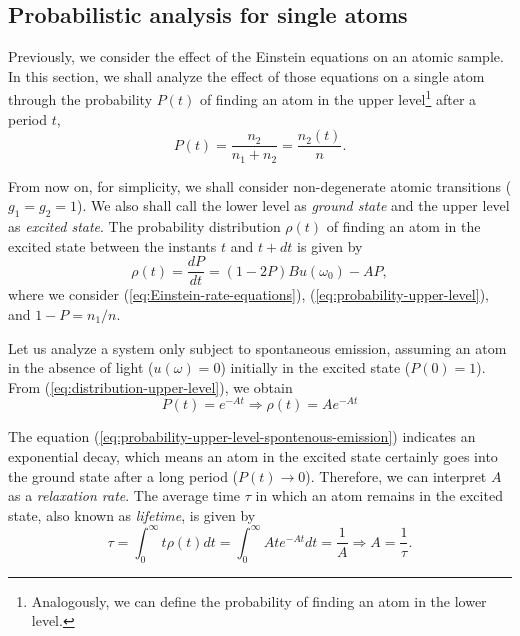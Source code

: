 %
\subsection{Probabilistic analysis for single atoms}
\label{sec:rate-equations-analysis-single-atoms}
%

Previously, we consider the effect of the Einstein equations on an atomic sample. In this section, we shall analyze the effect of those equations on a single atom through the probability $ P(t) $ of finding an atom in the upper level\footnote{Analogously, we can define the probability of finding an atom in the lower level.} after a period $t$,
\begin{equation}
	P(t) = \frac{n_2}{n_1 + n_2} = \frac{n_2(t)}{n}.
	\label{eq:probability-upper-level}
\end{equation}

From now on, for simplicity, we shall consider non-degenerate atomic transitions ($ g_1 = g_2 = 1 $). We also shall call the lower level as \textit{ground state} and the upper level as \textit{excited state}. The probability distribution $ \rho(t) $ of finding an atom in the excited state between the instants $t$ and $t + dt$ is given by
\begin{equation}
	\rho(t) = \frac{dP}{dt} = (1 - 2P) B u(\omega_0) - A P,
	\label{eq:distribution-upper-level}
\end{equation}
where we consider (\ref{eq:Einstein-rate-equations}), (\ref{eq:probability-upper-level}), and $ 1 - P = n_1 / n $.

Let us analyze a system only subject to spontaneous emission, assuming an atom in the absence of light ($ u(\omega) = 0 $) initially in the excited state ($ P(0) = 1 $). From (\ref{eq:distribution-upper-level}), we obtain
\begin{equation}
	P(t) = e^{-A t} \Rightarrow \rho(t) = A e^{-A t}
	\label{eq:probability-upper-level-spontenous-emission}
\end{equation}

The equation (\ref{eq:probability-upper-level-spontenous-emission}) indicates an exponential decay, which means an atom in the excited state certainly goes into the ground state after a long period ($ P(t) \longrightarrow 0 $). Therefore, we can interpret $ A $ as a \textit{relaxation rate}. The average time $ \tau $ in which an atom remains in the excited state, also known as \textit{lifetime}, is given by
\begin{equation}
	\tau = \int_{0}^{\infty} t \rho(t) dt = \int_{0}^{\infty} A t e^{-A t} dt = \frac{1}{A} \Rightarrow A = \frac{1}{\tau}.
\end{equation}

